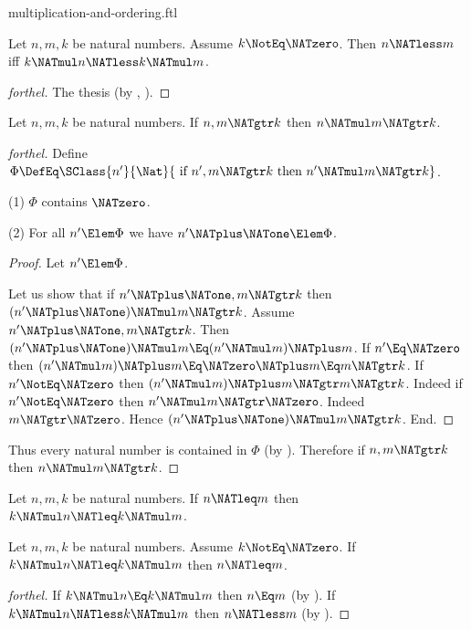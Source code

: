\documentclass{stex}
\begin{document}
\begin{smodule}{multiplication-and-ordering.ftl}
\begin{corollary}[forthel,name=preservation of ordering under left-multiplication]
  Let $n, m, k$ be natural numbers.
  Assume $k \NotEq \NATzero$.
  Then $n \NATless m$ iff $k \NATmul n \NATless k \NATmul m$.
\end{corollary}
\begin{proof}[forthel]
  The thesis (by , ).
\end{proof}

\begin{proposition}[forthel]
  Let $n, m, k$ be natural numbers.
  If $n, m \NATgtr k$ then $n \NATmul m \NATgtr k$.
\end{proposition}
\begin{proof}[forthel]
  Define $\Phi \DefEq \SClass{n'}{\Nat}{\text{ if }n', m \NATgtr k\text{ then }n' \NATmul m \NATgtr k}$.

  (1) $\Phi$ contains $\NATzero$.

  (2) For all $n' \Elem \Phi$ we have $n' \NATplus \NATone \Elem \Phi$.
  \begin{proof}
    Let $n' \Elem \Phi$.

    Let us show that if $n' \NATplus \NATone, m \NATgtr k$ then $(n' \NATplus \NATone) \NATmul m \NATgtr k$.
      Assume $n' \NATplus \NATone, m \NATgtr k$.
      Then $(n' \NATplus \NATone) \NATmul m \Eq (n' \NATmul m) \NATplus m$.
      If $n' \Eq \NATzero$ then
      $(n' \NATmul m) \NATplus m
        \Eq \NATzero \NATplus m
        \Eq m
        \NATgtr k$.
      If $n' \NotEq \NATzero$ then
      $(n' \NATmul m) \NATplus m
        \NATgtr m
        \NATgtr k$.
      Indeed if $n' \NotEq \NATzero$ then $n' \NATmul m \NATgtr \NATzero$.
      Indeed $m \NATgtr \NATzero$.
      Hence $(n' \NATplus \NATone) \NATmul m \NATgtr k$.
    End.
  \end{proof}

  Thus every natural number is contained in $\Phi$ (by ).
  Therefore if $n, m \NATgtr k$ then $n \NATmul m \NATgtr k$.
\end{proof}

\begin{corollary}[forthel]
  Let $n, m, k$ be natural numbers.
  If $n \NATleq m$ then $k \NATmul n \NATleq k \NATmul m$.
\end{corollary}

\begin{corollary}[forthel]
  Let $n, m, k$ be natural numbers.
  Assume $k \NotEq \NATzero$.
  If $k \NATmul n \NATleq k \NATmul m$ then $n \NATleq m$.
\end{corollary}
\begin{proof}[forthel]
  If $k \NATmul n \Eq k \NATmul m$ then $n \Eq m$ (by ).
  If $k \NATmul n \NATless k \NATmul m$ then $n \NATless m$ (by ).
\end{proof}


\end{smodule}
\end{document}
